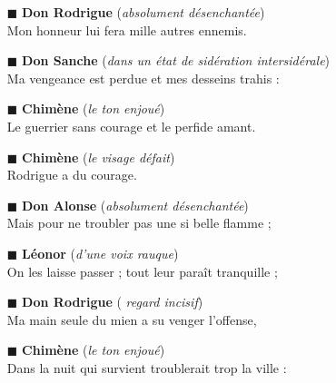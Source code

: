 \documentclass{article}
\begin{document}
	\begin{itemize}
		\item[$\blacksquare$] \textbf{Don Rodrigue} (\emph{absolument désenchantée}) \\
		\textsf{Mon honneur lui fera mille autres ennemis.}
		\item[$\blacksquare$] \textbf{Don Sanche} (\emph{dans un état de sidération intersidérale}) \\
		\textsf{Ma vengeance est perdue et mes desseins trahis :}
		\item[$\blacksquare$] \textbf{Chimène} (\emph{le ton enjoué}) \\
		\textsf{Le guerrier sans courage et le perfide amant.}
		\item[$\blacksquare$] \textbf{Chimène} (\emph{le visage défait}) \\
		\textsf{Rodrigue a du courage.}
		\item[$\blacksquare$] \textbf{Don Alonse} (\emph{absolument désenchantée}) \\
		\textsf{Mais pour ne troubler pas une si belle flamme ;}
		\item[$\blacksquare$] \textbf{Léonor} (\emph{d’une voix rauque}) \\
		\textsf{On les laisse passer ; tout leur paraît tranquille ;}
		\item[$\blacksquare$] \textbf{Don Rodrigue} (\emph{ regard incisif}) \\
		\textsf{Ma main seule du mien a su venger l’offense,}
		\item[$\blacksquare$] \textbf{Chimène} (\emph{le ton enjoué}) \\
		\textsf{Dans la nuit qui survient troublerait trop la ville :}
	\end{itemize}
\end{document}
